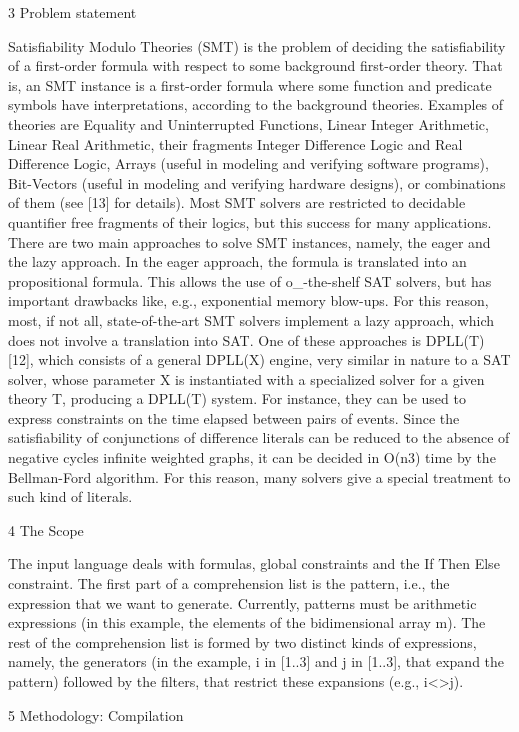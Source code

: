 \documentclass[11pt]{article} %
\begin{document}
3 Problem statement

Satisfiability Modulo Theories (SMT) is the problem of deciding the satisfiability
of a first-order formula with respect to some background first-order theory. That
is, an SMT instance is a first-order formula where some function and predicate
symbols have interpretations, according to the background theories.
Examples of theories are Equality and Uninterrupted Functions, Linear Integer Arithmetic, Linear Real Arithmetic, their fragments Integer Difference Logic
and Real Difference Logic, Arrays (useful in modeling and verifying software
programs), Bit-Vectors (useful in modeling and verifying hardware designs), or
combinations of them (see [13] for details). Most SMT solvers are restricted to
decidable quantifier free fragments of their logics, but this success for many applications. 
There are two main approaches to solve SMT instances, namely, the eager
and the lazy approach. In the eager approach, the formula is translated into
an propositional formula. This allows the use of o_-the-shelf SAT
solvers, but has important drawbacks like, e.g., exponential memory blow-ups.
For this reason, most, if not all, state-of-the-art SMT solvers implement a lazy
approach, which does not involve a translation into SAT. One of these approaches
is DPLL(T) [12], which consists of a general DPLL(X) engine, very similar in
nature to a SAT solver, whose parameter X is instantiated with a specialized
solver for a given theory T, producing a DPLL(T) system. For instance, they can be used to express constraints on the time elapsed between pairs of events. Since the satisfiability of conjunctions of difference literals can be reduced to the absence of negative cycles infinite weighted graphs, it can be decided in O(n3) time by the Bellman-Ford algorithm. For this reason, many solvers give a special treatment to such kind of literals.


4 The Scope

The input language deals with formulas, global constraints and the If Then Else
constraint.
The first part of a comprehension list is the pattern, i.e., the expression
that we want to generate. Currently, patterns must be arithmetic expressions
(in this example, the elements of the bidimensional array m). The rest of the
comprehension list is formed by two distinct kinds of expressions, namely, the
generators (in the example, i in [1..3] and j in [1..3], that expand the
pattern) followed by the filters, that restrict these expansions (e.g., i<>j).

5 Methodology: Compilation
\end{document}
